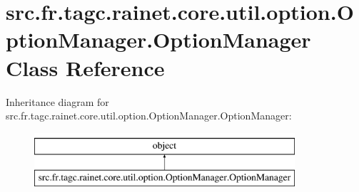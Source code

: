 \hypertarget{classsrc_1_1fr_1_1tagc_1_1rainet_1_1core_1_1util_1_1option_1_1OptionManager_1_1OptionManager}{\section{src.\-fr.\-tagc.\-rainet.\-core.\-util.\-option.\-Option\-Manager.\-Option\-Manager Class Reference}
\label{classsrc_1_1fr_1_1tagc_1_1rainet_1_1core_1_1util_1_1option_1_1OptionManager_1_1OptionManager}
}
Inheritance diagram for src.\-fr.\-tagc.\-rainet.\-core.\-util.\-option.\-Option\-Manager.\-Option\-Manager\-:\begin{figure}[H]
\begin{center}
\leavevmode
\includegraphics[height=2.000000cm]{classsrc_1_1fr_1_1tagc_1_1rainet_1_1core_1_1util_1_1option_1_1OptionManager_1_1OptionManager}
\end{center}
\end{figure}
